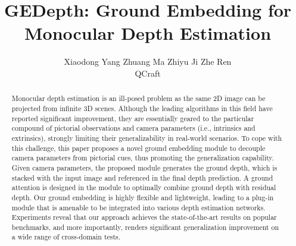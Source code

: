 \documentclass[10pt,twocolumn,letterpaper]{article}
\begin{document}
\title{GEDepth: Ground Embedding for Monocular Depth Estimation}

\author{Xiaodong Yang \qquad Zhuang Ma \qquad Zhiyu Ji \qquad Zhe Ren\\
QCraft
}

\maketitle
\ificcvfinal\thispagestyle{empty}\fi

\def\thefootnote{*}

\begin{abstract}
Monocular depth estimation is an ill-posed problem as the same 2D image can be projected from infinite 3D scenes. Although the leading algorithms in this field have reported significant improvement, they are essentially geared to the particular compound of pictorial observations and camera parameters (i.e., intrinsics and extrinsics), strongly limiting their generalizability in real-world scenarios. To cope with this challenge, this paper proposes a novel ground embedding module to decouple camera parameters from pictorial cues, thus promoting the generalization capability. Given camera parameters, the proposed module generates the ground depth, which is stacked with the input image and referenced in the final depth prediction. A ground attention is designed in the module to optimally combine ground depth with residual depth. Our ground embedding is highly flexible and lightweight, leading to a plug-in module that is amenable to be integrated into various depth estimation networks. Experiments reveal that our approach achieves the state-of-the-art results on popular benchmarks, and more importantly, renders significant generalization improvement on a wide range of cross-domain tests. 
\end{abstract}
\end{document}
